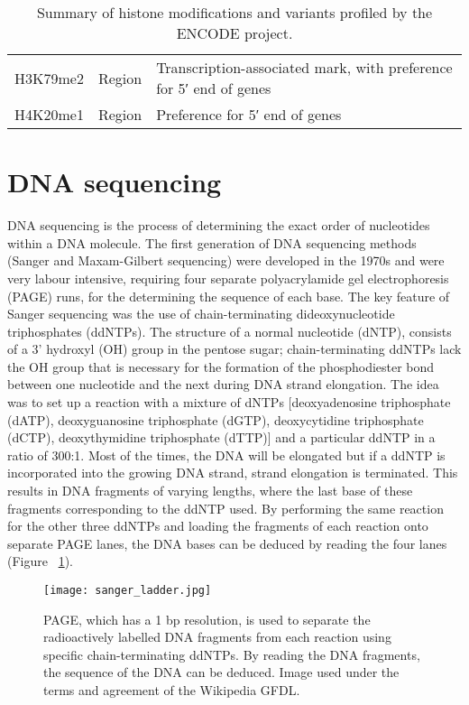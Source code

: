 \begin{table}[h]
\begin{tabular}{l l p{5cm}}
H3K79me2                        & Region                 & Transcription-associated mark, with preference for 5′ end of genes                                                                    \\
H4K20me1                        & Region                 & Preference for 5′ end of genes                                                                                                       
   \end{tabular}
   \caption[Table of histone modifications]{Summary of histone modifications and variants profiled by the ENCODE project\cite{pmid22955616}.}
   \label{table:histone_mod}
\end{table}

\section{DNA sequencing}

DNA sequencing is the process of determining the exact order of nucleotides within a DNA molecule. The first generation of DNA sequencing methods (Sanger and Maxam-Gilbert sequencing) were developed in the 1970s and were very labour intensive, requiring four separate polyacrylamide gel electrophoresis (PAGE) runs, for the determining the sequence of each base. The key feature of Sanger sequencing \cite{pmid271968} was the use of chain-terminating dideoxynucleotide triphosphates (ddNTPs). The structure of a normal nucleotide (dNTP), consists of a 3' hydroxyl (OH) group in the pentose sugar; chain-terminating ddNTPs lack the OH group that is necessary for the formation of the phosphodiester bond between one nucleotide and the next during DNA strand elongation. The idea was to set up a reaction with a mixture of dNTPs [deoxyadenosine triphosphate (dATP), deoxyguanosine triphosphate (dGTP), deoxycytidine triphosphate (dCTP), deoxythymidine triphosphate (dTTP)] and a particular ddNTP in a ratio of 300:1. Most of the times, the DNA will be elongated but if a ddNTP is incorporated into the growing DNA strand, strand elongation is terminated. This results in DNA fragments of varying lengths, where the last base of these fragments corresponding to the ddNTP used. By performing the same reaction for the other three ddNTPs and loading the fragments of each reaction onto separate PAGE lanes, the DNA bases can be deduced by reading the four lanes (Figure ~\ref{fig:sanger_ladder}).

\begin{figure}[!ht]
   \centering
   \texttt{[image: sanger\_ladder.jpg]}
   \caption[Radioactively labelled sequencing gel]{PAGE, which has a 1 bp resolution, is used to separate the radioactively labelled DNA fragments from each reaction using specific chain-terminating ddNTPs. By reading the DNA fragments, the sequence of the DNA can be deduced. Image used under the terms and agreement of the Wikipedia GFDL.}
   \label{fig:sanger_ladder}
\end{figure}

